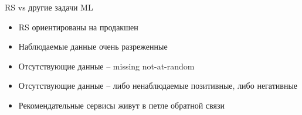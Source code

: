 \documentclass[11pt,aspectratio=169,handout]{beamer}
\begin{document}
{
\begin{frame}[plain]
\end{frame}
}

{
\begin{frame}[plain]
\end{frame}
}

{
\begin{frame}[plain]
\end{frame}
}

{
\begin{frame}[plain]
\end{frame}
}

\begin{frame}{RS vs другие задачи ML \cite{NETFLIX}}

\begin{itemize}[<+->]
\item RS ориентированы на продакшен
\item Наблюдаемые данные очень разреженные
\item Отсутствующие данные -- missing not-at-random
\item Отсутствующие данные -- либо ненаблюдаемые позитивные, либо негативные
\item Рекомендательные сервисы живут в петле обратной связи
\end{itemize}

\end{frame}
\end{document}
